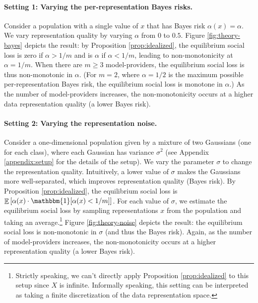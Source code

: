 \documentclass[letterpaper,11pt]{article}
\theoremstyle{plain}
\DeclareMathOperator*{\E}{\mathbb{E}}
\begin{document}
\paragraph{Setting 1: Varying the per-representation Bayes risks.} Consider a population with a single value of $x$ that has Bayes risk $\alpha(x) = \alpha$. We vary representation quality by varying $\alpha$ from $0$ to $0.5$. 
Figure \ref{fig:theory-bayes} depicts the result: by Proposition \ref{prop:idealized}, the equilibrium social loss is zero if $\alpha >1/m$ and is $\alpha$ if $\alpha < 1/m$, leading to  
non-monotonicity at $\alpha = 1/m$. When there are $m \ge 3$ model-providers, the equilibrium social loss is thus non-monotonic in $\alpha$. (For $m = 2$, where $\alpha = 1/2$ is the maximum possible per-representation Bayes risk, the equilibrium social loss is monotone in $\alpha$.) As the number of model-providers increases, the non-monotonicity occurs at a higher data representation quality (a lower Bayes risk). 

\paragraph{Setting 2: Varying the representation noise.} Consider a one-dimensional population given by a mixture of two Gaussians (one for each class), where each Gaussian has variance $\sigma^2$ (see Appendix \ref{appendix:setup} for the details of the setup). We vary the parameter $\sigma$ to change the representation quality. Intuitively, a lower value of $\sigma$ makes the Gaussians more well-separated, which improves representation quality (Bayes risk). By Proposition \ref{prop:idealized}, the equilibrium social loss is $\E \left[\alpha(x) \cdot \mathbbm{1}[\alpha(x) < 1/m] \right]$. For each value of $\sigma$, we estimate the equilibrium social loss by sampling representations $x$ from the population and taking an average.\footnote{Strictly speaking, we can't directly apply Proposition \ref{prop:idealized} to this setup since $X$ is infinite. Informally speaking, this setting can be interpreted as taking a finite discretization of the data representation space.} 
Figure \ref{fig:theory-noise} depicts the result: the equilibrium social loss is non-monotonic in $\sigma$ (and thus the Bayes risk). Again, as the number of model-providers increases, the non-monotonicity occurs at a higher representation quality (a lower Bayes risk).  
\end{document}

